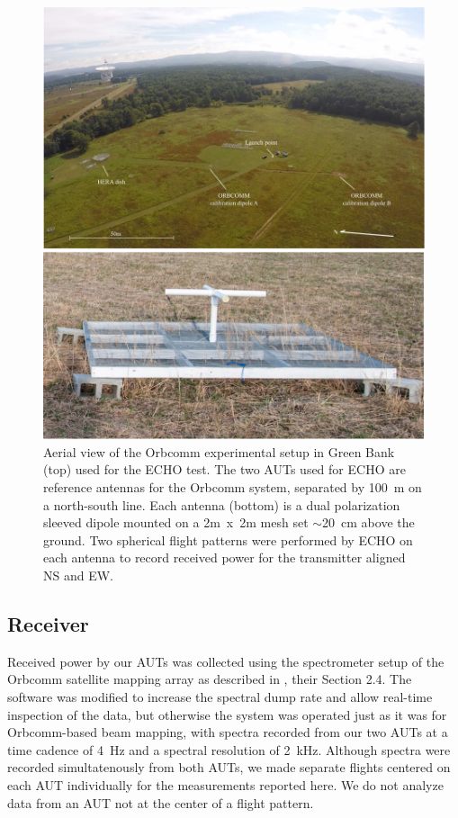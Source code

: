 \documentclass[preprint2,numberedappendix,tighten,twocolappendix]{aastex6}
\begin{document}
\begin{figure}
\begin{center}
\includegraphics[width=\columnwidth]{figures/Green_Bank_aerial_diagram_extended.jpg}
\caption{Aerial view of the Orbcomm experimental setup in Green Bank (top) used for the ECHO test.  The two AUTs used for ECHO are reference antennas for the Orbcomm system, separated by 100~m on a north-south line. Each antenna (bottom) is a dual polarization sleeved dipole mounted on a 2m~x~2m mesh set $\sim$20~cm above the ground.  Two spherical flight patterns were performed by ECHO on each antenna to record received power for the transmitter aligned NS and EW.  }
\label{fig:GB_aerial}
\end{center}
\end{figure}


\subsection{Receiver}

Received power by our AUTs was collected using the spectrometer setup of the Orbcomm satellite mapping array as described in \citet{2016:NebenHERAdish}, their Section 2.4. The software was modified  to increase the spectral dump rate and allow real-time inspection of the data, but otherwise the system was operated just as it was for Orbcomm-based beam mapping, with spectra recorded from our two AUTs at a time cadence of 4~Hz and a spectral resolution of 2~kHz.   Although spectra were recorded simultatenously from both AUTs, we made separate flights centered on each AUT individually for the measurements reported here.  We do not analyze data from an AUT not at the center of a flight pattern.
\end{document}

